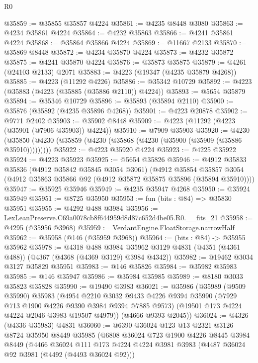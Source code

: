 \begin{lexlean}{R0}
\begin{coremodule}
@35859 := @35855 @35857 @4224
@35861 := @4235 @8448 @3080
@35863 := @4234 @35861 @4224
@35864 := @4232 @35863
@35866 := @4241 @35861 @4224
@35868 := @35864 @35866 @4224
@35869 := @11667 @2133
@35870 := @35869 @8448
@35872 := @4234 @35870 @4224
@35873 := @4232 @35872
@35875 := @4241 @35870 @4224
@35876 := @35873 @35875
@35879 := @4261 (@24103 @2133) @2071
@35883 := @4223 (@19347 (@4235 @35879 @4268))
@35885 := @4223 (@11292 @4226)
@35886 := @35342 @10729
@35892 := @4223 (@35883 (@4223 (@35885 (@35886 @2110)) @4224))
@35893 := @5654 @35879
@35894 := @35346 @10729
@35896 := @35893 (@35894 @2110)
@35900 := @35876 (@35892 (@4235 @35896 @4268))
@35901 := @4223 @20878
@35902 := @9771 @2402
@35903 := @35902 @8448
@35909 := @4223 (@11292 (@4223 (@35901 (@7906 @35903)) @4224))
@35910 := @7909 @35903
@35920 := @4230 (@35850 (@4230 (@35859 (@4230 (@35868 (@4230 (@35900 (@35909 (@35886 @35910)))))))))
@35922 := @4223 @35920 @4224
@35923 := @4225 @35922
@35924 := @4223 @35923
@35925 := @5654 @35826
@35946 := @4912
    @35833
    @35836
    (@4912 @35842 @35845 @3054 @3061)
    (@4912
      @35854
      @35857
      @3054
      (@4912 @35863 @35866 @92 (@4912 @35872 @35875 @35896 (@35894 @35910))))
@35947 := @35925 @35946
@35949 := @4235 @35947 @4268
@35950 := @35924 @35949
@35951 := @8725 @35950
@35953 := fun (bits : @84) => @35830 @35951
@35955 := @4292 @488 @3984
@35956 := LexLeanPreserve.C69a0078cb8f644959d8d87c652d4be05.R0.__fits_21
@35958 := @4295 (@35956 @3968)
@35959 := VerdantEngine.FloatStorage.narrowHalf
@35962 := @35958 (@146 (@35959 @3968))
@35964 := (bits : @84) -> @35955 @35962
@35978 := @4318
    @488
    @3984
    @35962
    @3129
    @4831
    (@4351 (@4361 @488))
    (@4367 (@4368 (@4369 @3129) @3984 @4342))
@35982 := @19462 @3034 @3127 @35829 @35951
@35983 := @146 @35826
@35984 := @35982 @35983
@35985 := @146 @35947
@35986 := @35984 @35985
@35989 := @8180 @3033 @35823 @35828
@35990 := @19490 @3983
@36021 := @35986
    (@35989
      (@9509 @35990)
      @35983
      (@4954
        @2210
        @3032
        @9433
        @4226
        @9394
        @35990
        (@7929 @713 @1900 @4226 @9390 @3984 @9394 @7885 @9573)
        (@19501 @173 @4224 @4224 @2046 @3983 @19507 @4979))
      (@4666 @9393 @2045))
@36024 := @4326 (@4336 @35983) @4831
@36060 := @6390
    @36024
    @123
    @13
    @2321
    @3126
    @8724
    @35950
    @8449
    @35985
    (@6808
      @36024
      @723
      @1900
      @4226
      @8445
      @3984
      @8449
      (@4466
        @36024
        @111
        @173
        @4224
        @4224
        @3981
        @3983
        (@4487 @36024 @92 @3981 (@4492 (@4493 @36024 @92)))

\end{coremodule}
\end{lexlean}
